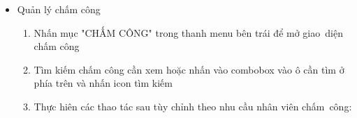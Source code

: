 \documentclass[a4paper,12pt]{report}
\begin{document}
\begin{itemize}
\begin{itemize}
\begin{enumerate}[label=B\arabic*:]
\begin{enumerate}[label=B3.\arabic*:]
\begin{itemize}
                                            \item In file: Khi nhấn nút icon "In" thì hệ thống sẽ in file pdf cho người dùng
                                        \end{itemize}
                                  \item Danh sách đơn xin
                                        \begin{itemize}
                                            \item Tìm kiếm hoặc nhấn vào combobox vào ô cần tìm ở phía trên và nhấn icon tìm kiếm
                                            \item Thêm đơn xin: Khi nhấn nút icon "Thêm" sẽ hiện giao diện nhập các thông tin
                                            \item Sửa: Nhấn chọn 1 dòng trong bảng danh sách đơn xin để sửa thông tin cần sửa (Lưu ý dựa vào chức vụ mới có thể sửa)
                                            \item Xem: Nhấn chọn 1 dòng trong bảng danh sách đơn xin, hệ~thống sẽ hiện đầy đủ thông tin đơn
                                            \item Xóa: Chọn 1 dòng trong danh sách đơn xin để xóa. Hệ thống sẽ xác nhận lại có xóa không, sau đó sẽ thực hiện xóa (Lưu ý dựa vào chức vụ mới có thể sửa)
                                            \item Xuất file Excel: Khi nhấn nút icon "Excel" thì hệ thống sẽ xuất file excel cho người dùng
                                            \item In file: Khi nhấn nút icon "In" thì hệ thống sẽ in file pdf cho người dùng
                                        \end{itemize}
                              \end{enumerate}
                    \end{enumerate}
              \item Quản lý chấm công
                    \begin{enumerate}[label=B\arabic*:]
                        \item Nhấn mục "CHẤM CÔNG" trong thanh menu bên trái để mở giao~diện chấm công
                        \item Tìm kiếm chấm công cần xem hoặc nhấn vào combobox vào ô cần tìm ở phía trên và nhấn icon tìm kiếm
                        \item Thực hiên các thao tác sau tùy chỉnh theo nhu cầu nhân viên chấm~công:

\end{enumerate}
\end{itemize}
\end{itemize}
\end{document}
